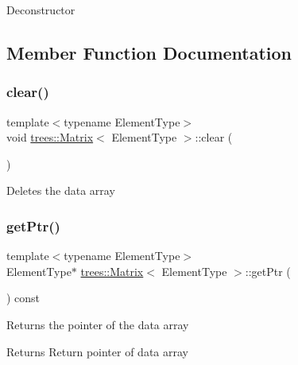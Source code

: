 Deconstructor 

\subsection{Member Function Documentation}
\mbox{\label{classtrees_1_1_matrix_a6911e51830c70251a2655c080f4ad04e}} 
\subsubsection{\texorpdfstring{clear()}{clear()}}
{\footnotesize\ttfamily template$<$typename Element\+Type$>$ \\
void \hyperlink{classtrees_1_1_matrix}{trees\+::\+Matrix}$<$ Element\+Type $>$\+::clear (\begin{DoxyParamCaption}{ }\end{DoxyParamCaption})\hspace{0.3cm}{\ttfamily [inline]}}

Deletes the data array \mbox{\label{classtrees_1_1_matrix_ae4c759a614daf9f1f019566eca92edab}} 
\subsubsection{\texorpdfstring{get\+Ptr()}{getPtr()}}
{\footnotesize\ttfamily template$<$typename Element\+Type$>$ \\
Element\+Type$\ast$ \hyperlink{classtrees_1_1_matrix}{trees\+::\+Matrix}$<$ Element\+Type $>$\+::get\+Ptr (\begin{DoxyParamCaption}{ }\end{DoxyParamCaption}) const\hspace{0.3cm}{\ttfamily [inline]}}

Returns the pointer of the data array

\begin{DoxyReturn}{Returns}
Return pointer of data array 
\end{DoxyReturn}
\mbox{\label{classtrees_1_1_matrix_a1467c63bceec8a38771c845fad759784}} 
